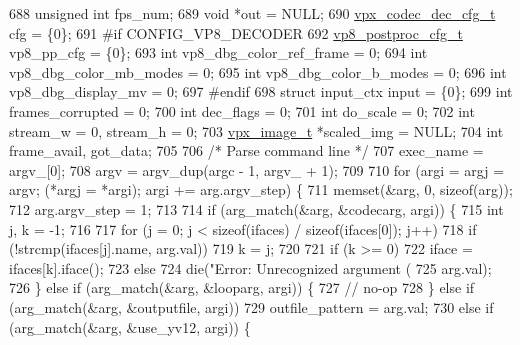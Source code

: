 \begin{DoxyCodeInclude}
{{{{{{{{{{{{{{{{{{{{{{{688   \textcolor{keywordtype}{unsigned} \textcolor{keywordtype}{int}            fps\_num;
689   \textcolor{keywordtype}{void}                   *out = NULL;
690   \hyperlink{structvpx__codec__dec__cfg}{vpx\_codec\_dec\_cfg\_t}     cfg = \{0\};
691 \textcolor{preprocessor}{#if CONFIG\_VP8\_DECODER}
692   \hyperlink{structvp8__postproc__cfg}{vp8\_postproc\_cfg\_t}      vp8\_pp\_cfg = \{0\};
693   \textcolor{keywordtype}{int}                     vp8\_dbg\_color\_ref\_frame = 0;
694   \textcolor{keywordtype}{int}                     vp8\_dbg\_color\_mb\_modes = 0;
695   \textcolor{keywordtype}{int}                     vp8\_dbg\_color\_b\_modes = 0;
696   \textcolor{keywordtype}{int}                     vp8\_dbg\_display\_mv = 0;
697 \textcolor{preprocessor}{#endif}
698   \textcolor{keyword}{struct }input\_ctx        input = \{0\};
699   \textcolor{keywordtype}{int}                     frames\_corrupted = 0;
700   \textcolor{keywordtype}{int}                     dec\_flags = 0;
701   \textcolor{keywordtype}{int}                     do\_scale = 0;
702   \textcolor{keywordtype}{int}                     stream\_w = 0, stream\_h = 0;
703   \hyperlink{structvpx__image}{vpx\_image\_t}             *scaled\_img = NULL;
704   \textcolor{keywordtype}{int}                     frame\_avail, got\_data;
705 
706   \textcolor{comment}{/* Parse command line */}
707   exec\_name = argv\_[0];
708   argv = argv\_dup(argc - 1, argv\_ + 1);
709 
710   \textcolor{keywordflow}{for} (argi = argj = argv; (*argj = *argi); argi += arg.argv\_step) \{
711     memset(&arg, 0, \textcolor{keyword}{sizeof}(arg));
712     arg.argv\_step = 1;
713 
714     \textcolor{keywordflow}{if} (arg\_match(&arg, &codecarg, argi)) \{
715       \textcolor{keywordtype}{int} j, k = -1;
716 
717       \textcolor{keywordflow}{for} (j = 0; j < \textcolor{keyword}{sizeof}(ifaces) / \textcolor{keyword}{sizeof}(ifaces[0]); j++)
718         \textcolor{keywordflow}{if} (!strcmp(ifaces[j].name, arg.val))
719           k = j;
720 
721       \textcolor{keywordflow}{if} (k >= 0)
722         iface = ifaces[k].iface();
723       \textcolor{keywordflow}{else}
724         die(\textcolor{stringliteral}{"Error: Unrecognized argument (%
725             arg.val);
726     \} \textcolor{keywordflow}{else} \textcolor{keywordflow}{if} (arg\_match(&arg, &looparg, argi)) \{
727       \textcolor{comment}{// no-op}
728     \} \textcolor{keywordflow}{else} \textcolor{keywordflow}{if} (arg\_match(&arg, &outputfile, argi))
729       outfile\_pattern = arg.val;
730     \textcolor{keywordflow}{else} \textcolor{keywordflow}{if} (arg\_match(&arg, &use\_yv12, argi)) \{
}}}}}}}}}}}}}}}}}}}}}}}}
\end{DoxyCodeInclude}
